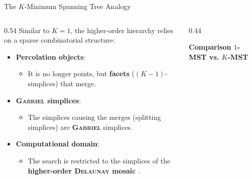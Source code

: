 \documentclass[A4,svgnames,9pt,aspectratio=169]{beamer}
\begin{document}
\begin{frame}{The $K$-Minimum Spanning Tree Analogy}
    \begin{columns}[c, onlytextwidth]
        \begin{column}{0.54\textwidth}
            Similar to $K=1$, the higher-order hierarchy relies on a sparse combinatorial structure:
            
            \vspace{0.3cm}
            \begin{itemize}
                \setlength{\itemsep}{10pt}
                \item \textbf{Percolation objects}:
                \begin{itemize}
                    \item It is no longer points, but \textbf{facets} ($(K-1)$-simplices) that merge.
                \end{itemize}
                \item \textbf{\textsc{Gabriel} simplices}:
                \begin{itemize}
                    \item The simplices causing the merges (splitting simplices) are \textbf{\textsc{Gabriel}} simplices.
                \end{itemize}
                \item \textbf{Computational domain}:
                \begin{itemize}
                    \item The search is restricted to the simplices of the \textbf{higher-order \textsc{Delaunay} mosaic} \cite{osangEdelsbrunner2023algorithm}.
                \end{itemize}
            \end{itemize}
        \end{column}
        
        \begin{column}{0.44\textwidth}
            \begin{center}
                \textbf{Comparison $1$-MST vs. $K$-MST}
                

\end{center}
\end{column}
\end{columns}
\end{frame}
\end{document}
